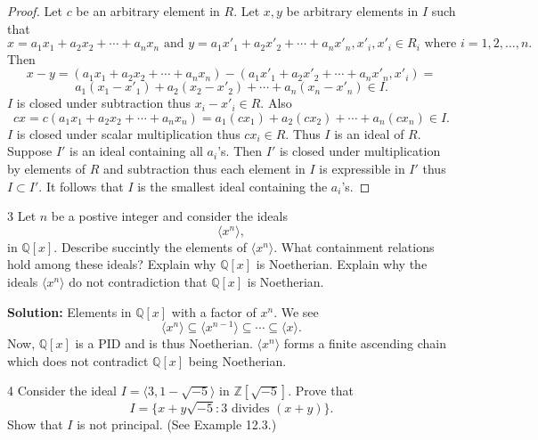 \begin{proof}
    Let $c$ be an arbitrary element in $R$.
    Let $x, y$ be arbitrary elements in $I$ such that 
    \[x = a_1 x_1 + a_2 x_2 + \cdots + a_n x_n \text{ and } y = a_1 x'_1 + a_2 x'_2 + \cdots + a_n x'_n, x'_i, x'_i \in R_i \text{ where } i = 1, 2, \ldots, n.\]
    Then 
    \[x - y = (a_1 x_1 + a_2 x_2 + \cdots + a_n x_n) - (a_1 x'_1 + a_2 x'_2 + \cdots + a_n x'_n, x'_i) = \] 
    \[a_1(x_1 - x'_1) + a_2(x_2 - x'_2) + \cdots + a_n(x_n - x'_n) \in I.\]
    $I$ is closed under subtraction thus $x_i - x'_i \in R$. 
    Also 
    \[cx = c(a_1 x_1 + a_2 x_2 + \cdots + a_n x_n) = a_1 (c x_1) + a_2 (c x_2) + \cdots + a_n (c x_n) \in I.\]
    $I$ is closed under scalar multiplication thus $c x_i \in R$.
    Thus $I$ is an ideal of $R$.
    Suppose $I'$ is an ideal containing all $a_i$'s.
    Then $I'$ is closed under multiplication by elements of $R$
        and subtraction thus each element in $I$ is expressible 
        in $I'$ thus $I \subset I'$.
    It follows that $I$ is the smallest ideal containing the $a_i$'s.
\end{proof}

\begin{problem}{3}
    Let $n$ be a postive integer and consider the ideals 
    \[\langle x^n \rangle,\]
    in $\mathbb{Q}[x]$. Describe succintly the elements of $\langle x^n \rangle$.
    What containment relations hold among these ideals?
    Explain why $\mathbb{Q}[x]$ is Noetherian. Explain 
    why the ideals $\langle x^n \rangle$ do not contradiction that $\mathbb{Q}[x]$
    is Noetherian.
\end{problem}
\solved

\textbf{Solution: }
Elements in $\mathbb{Q}[x]$ with a factor of $x^n$.
We see 
\[\langle x^n \rangle \subseteq \langle x^{n - 1} \rangle \subseteq \cdots \subseteq \langle x \rangle.\]
Now, $\mathbb{Q}[x]$ is a PID and is thus Noetherian.
$\langle x^n \rangle$ forms a finite ascending chain which does not contradict $\mathbb{Q}[x]$ being Noetherian.

\begin{problem}{4}
    Consider the ideal $I = \langle 3, 1 - \sqrt{-5} \rangle$ in $\mathbb{Z}[\sqrt{-5}]$.
    Prove that
    \[I = \{x + y\sqrt{-5} : 3 \text{ divides } (x + y)\}.\]
    Show that $I$ is not principal. (See Example 12.3.)
\end{problem}
\unsolved


